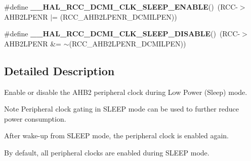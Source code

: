 \begin{DoxyCompactItemize}
\item 
\#define {\bfseries \+\_\+\+\_\+\+H\+A\+L\+\_\+\+R\+C\+C\+\_\+\+D\+C\+M\+I\+\_\+\+C\+L\+K\+\_\+\+S\+L\+E\+E\+P\+\_\+\+E\+N\+A\+B\+LE}()~(R\+CC-\/$>$A\+H\+B2\+L\+P\+E\+NR $\vert$= (R\+C\+C\+\_\+\+A\+H\+B2\+L\+P\+E\+N\+R\+\_\+\+D\+C\+M\+I\+L\+P\+EN))\hypertarget{group___r_c_c_ex___a_h_b2___low_power___enable___disable_gaf6fa397bcd717325032e3425fd424988}{}\label{group___r_c_c_ex___a_h_b2___low_power___enable___disable_gaf6fa397bcd717325032e3425fd424988}

\item 
\#define {\bfseries \+\_\+\+\_\+\+H\+A\+L\+\_\+\+R\+C\+C\+\_\+\+D\+C\+M\+I\+\_\+\+C\+L\+K\+\_\+\+S\+L\+E\+E\+P\+\_\+\+D\+I\+S\+A\+B\+LE}()~(R\+CC-\/$>$A\+H\+B2\+L\+P\+E\+NR \&= $\sim$(R\+C\+C\+\_\+\+A\+H\+B2\+L\+P\+E\+N\+R\+\_\+\+D\+C\+M\+I\+L\+P\+EN))\hypertarget{group___r_c_c_ex___a_h_b2___low_power___enable___disable_ga79206abe44d6019725e0c0240ec46778}{}\label{group___r_c_c_ex___a_h_b2___low_power___enable___disable_ga79206abe44d6019725e0c0240ec46778}

\end{DoxyCompactItemize}


\subsection{Detailed Description}
Enable or disable the A\+H\+B2 peripheral clock during Low Power (Sleep) mode. 

\begin{DoxyNote}{Note}
Peripheral clock gating in S\+L\+E\+EP mode can be used to further reduce power consumption. 

After wake-\/up from S\+L\+E\+EP mode, the peripheral clock is enabled again. 

By default, all peripheral clocks are enabled during S\+L\+E\+EP mode. 
\end{DoxyNote}
